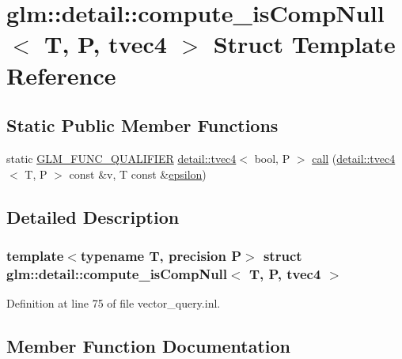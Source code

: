 \hypertarget{structglm_1_1detail_1_1compute__is_comp_null_3_01_t_00_01_p_00_01tvec4_01_4}{}\section{glm\+:\+:detail\+:\+:compute\+\_\+is\+Comp\+Null$<$ T, P, tvec4 $>$ Struct Template Reference}
\label{structglm_1_1detail_1_1compute__is_comp_null_3_01_t_00_01_p_00_01tvec4_01_4}
\subsection*{Static Public Member Functions}
\begin{DoxyCompactItemize}
\item 
static \hyperlink{setup_8hpp_a33fdea6f91c5f834105f7415e2a64407}{G\+L\+M\+\_\+\+F\+U\+N\+C\+\_\+\+Q\+U\+A\+L\+I\+F\+I\+ER} \hyperlink{structglm_1_1detail_1_1tvec4}{detail\+::tvec4}$<$ bool, P $>$ \hyperlink{structglm_1_1detail_1_1compute__is_comp_null_3_01_t_00_01_p_00_01tvec4_01_4_a07a877d176273d44a95922243f035ce8}{call} (\hyperlink{structglm_1_1detail_1_1tvec4}{detail\+::tvec4}$<$ T, P $>$ const \&v, T const \&\hyperlink{group__gtc__constants_gacb41049b8d22c8aa90e362b96c524feb}{epsilon})
\end{DoxyCompactItemize}


\subsection{Detailed Description}
\subsubsection*{template$<$typename T, precision P$>$\newline
struct glm\+::detail\+::compute\+\_\+is\+Comp\+Null$<$ T, P, tvec4 $>$}



Definition at line 75 of file vector\+\_\+query.\+inl.



\subsection{Member Function Documentation}
\mbox{\label{structglm_1_1detail_1_1compute__is_comp_null_3_01_t_00_01_p_00_01tvec4_01_4_a07a877d176273d44a95922243f035ce8}} 
